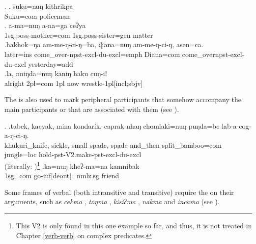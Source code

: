 \ex. \ag.  suku=nuŋ   kithrikpa\\
Suku{\sc =com} policeman\\
 
		\bg. a-ma=nuŋ  a-na=ga ceʔya\\
{\sc 1sg.poss-}mother{\sc=com} {\sc 1sg.poss-}sister{\sc=gen} matter\\
		\bg.hakhok=ŋa  am-me-ŋ-ci-ŋ=ba, ɖiana=nuŋ     am-me-ŋ-ci-ŋ, asen=ca.\\
		later{\sc =ins} come\_over{\sc -npst-excl-du-excl=emph} Diana{\sc =com} come\_over{\sc npst-excl-du-excl} yesterday{\sc =add}\\
		\bg.la,    nniŋda=nuŋ   kaniŋ haku cuŋ-iǃ\\
		alright {\sc 2pl=com} {\sc 1pl} now wrestle{\sc -1pl[incl;sbjv]}\\
			
The  is also used to mark peripheral participants that somehow accompany the main participants or that are associated with them (see \Next).

\ex. \ag.tabek,                 kacyak, mina  kondarik,               caprak                 nhaŋ    chomlaki=nuŋ       puŋda=be    lab-a-cog-a-ŋ-ci-ŋ.\\
khukuri\_knife, sickle, small spade, spade and\_then split\_bamboo{\sc =com}  jungle{\sc =loc} hold{\sc -pst-V2.make-pst-excl-du-excl}\\
 (literally: )\footnote{This V2 is only found in this one example so far, and thus, it is not treated in Chapter \ref{verb-verb} on complex predicates.} 
\bg.ka=nuŋ kheʔ-ma=na kamnibak\\
{\sc 1sg=com} go{\sc -inf[deont]=nmlz.sg} friend\\
		
Some frames of verbal  (both intransitive and transitive) require the  on their arguments, such as \emph{cekma} , \emph{toŋma} , \emph{kisiʔma} , \emph{nakma}  and \emph{incama}  (see \Next).		
				
